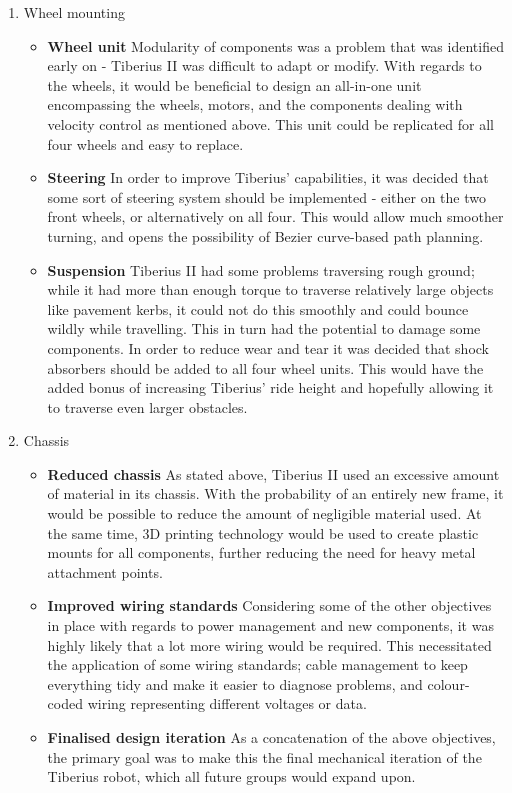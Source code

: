 \begin{enumerate}
\item Wheel mounting
\begin{itemize}
\item \textbf{Wheel unit}
\newline
Modularity of components was a problem that was identified early on - Tiberius II was difficult to adapt or modify. With regards to the wheels, it would be beneficial to design an all-in-one unit encompassing the wheels, motors, and the components dealing with velocity control as mentioned above. This unit could be replicated for all four wheels and easy to replace.
\item \textbf{Steering}
\newline
In order to improve Tiberius' capabilities, it was decided that some sort of steering system should be implemented - either on the two front wheels, or alternatively on all four. This would allow much smoother turning, and opens the possibility of Bezier curve-based path planning.\cite{Dun_bezier}
\item \textbf{Suspension}
\newline
Tiberius II had some problems traversing rough ground; while it had more than enough torque to traverse relatively large objects like pavement kerbs, it could not do this smoothly and could bounce wildly while travelling. This in turn had the potential to damage some components. In order to reduce wear and tear it was decided that shock absorbers should be added to all four wheel units. This would have the added bonus of increasing Tiberius' ride height and hopefully allowing it to traverse even larger obstacles.
\end{itemize}

\item Chassis
\begin{itemize}
\item \textbf{Reduced chassis}
\newline
As stated above, Tiberius II used an excessive amount of material in its chassis. With the probability of an entirely new frame, it would be possible to reduce the amount of negligible material used. At the same time, 3D printing technology would be used to create plastic mounts for all components, further reducing the need for heavy metal attachment points.
\item \textbf{Improved wiring standards}
\newline
Considering some of the other objectives in place with regards to power management and new components, it was highly likely that a lot more wiring would be required. This necessitated the application of some wiring standards; cable management to keep everything tidy and make it easier to diagnose problems, and colour-coded wiring representing different voltages or data.
\item \textbf{Finalised design iteration}
\newline
As a concatenation of the above objectives, the primary goal was to make this the final mechanical iteration of the Tiberius robot, which all future groups would expand upon.
\end{itemize}
\end{enumerate}